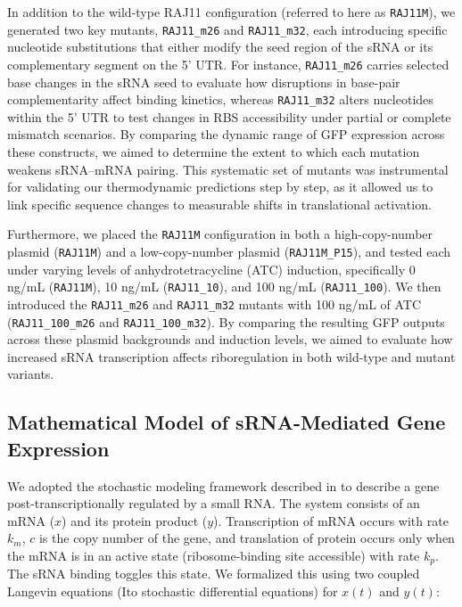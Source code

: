 In addition to the wild-type RAJ11 configuration (referred to here as \texttt{RAJ11M}), we generated two key mutants, \texttt{RAJ11\_m26} and \texttt{RAJ11\_m32}, each introducing specific nucleotide substitutions that either modify the seed region of the sRNA or its complementary segment on the 5' UTR. For instance, \texttt{RAJ11\_m26} carries selected base changes in the sRNA seed to evaluate how disruptions in base-pair complementarity affect binding kinetics, whereas \texttt{RAJ11\_m32} alters nucleotides within the 5' UTR to test changes in RBS accessibility under partial or complete mismatch scenarios. By comparing the dynamic range of GFP expression across these constructs, we aimed to determine the extent to which each mutation weakens sRNA--mRNA pairing. This systematic set of mutants was instrumental for validating our thermodynamic predictions step by step, as it allowed us to link specific sequence changes to measurable shifts in translational activation.

Furthermore, we placed the \texttt{RAJ11M} configuration in both a high-copy-number plasmid (\texttt{RAJ11M}) and a low-copy-number plasmid (\texttt{RAJ11M\_P15}), and tested each under varying levels of anhydrotetracycline (ATC) induction, specifically 0 ng/mL (\texttt{RAJ11M}), 10 ng/mL (\texttt{RAJ11\_10}), and 100 ng/mL (\texttt{RAJ11\_100}). We then introduced the \texttt{RAJ11\_m26} and \texttt{RAJ11\_m32} mutants with 100 ng/mL of ATC (\texttt{RAJ11\_100\_m26} and \texttt{RAJ11\_100\_m32}). By comparing the resulting GFP outputs across these plasmid backgrounds and induction levels, we aimed to evaluate how increased sRNA transcription affects riboregulation in both wild-type and mutant variants.

\subsection*{Mathematical Model of sRNA-Mediated Gene Expression} We adopted the stochastic modeling framework described in \cite{Rodrigo2018} to describe a gene post-transcriptionally regulated by a small RNA. The system consists of an mRNA ($x$) and its protein product ($y$). Transcription of mRNA occurs with rate $k_m$, $c$ is the copy number of the gene, and translation of protein occurs only when the mRNA is in an active state (ribosome-binding site accessible) with rate $k_p$. The sRNA binding toggles this state. We formalized this using two coupled Langevin equations (Ito stochastic differential equations) for $x(t)$ and $y(t)$:

